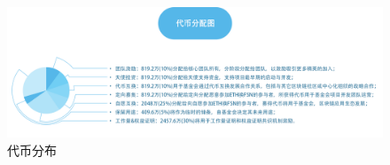 \documentclass[a4paper,12pt]{article}
\begin{document}
\begin{figure}[htbp]
\centering\includegraphics[width=6in]{pic_cn/tokenratio.png}
\caption{代币分布}\label{fig:tokenratio}
\end{figure}


\appendix
\clearpage
\renewcommand\refname{参考文献}


\clearpage

\end{document}
